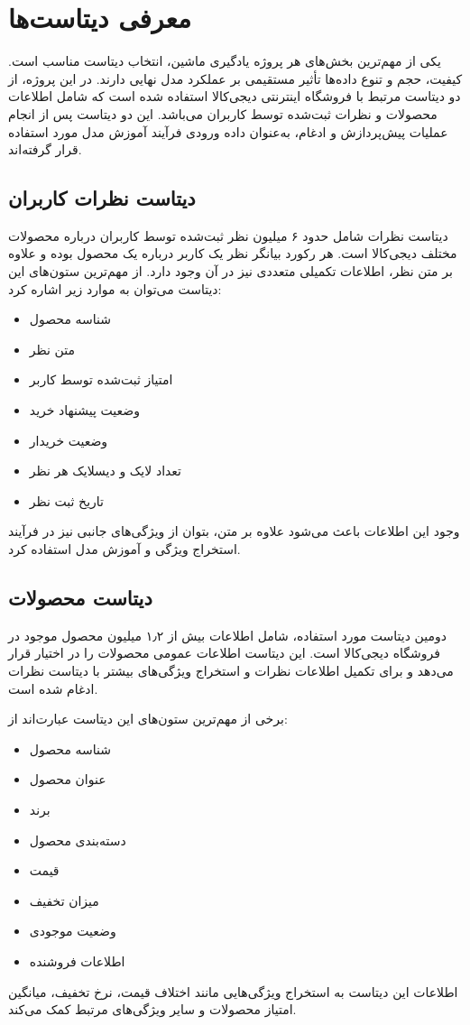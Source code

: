 \section{معرفی دیتاست‌ها}
یکی از مهم‌ترین بخش‌های هر پروژه یادگیری ماشین، انتخاب دیتاست مناسب است. کیفیت، حجم و تنوع داده‌ها تأثیر مستقیمی بر عملکرد مدل نهایی دارند. در این پروژه، از دو دیتاست مرتبط با فروشگاه اینترنتی دیجی‌کالا استفاده شده است که شامل اطلاعات محصولات و نظرات ثبت‌شده توسط کاربران می‌باشد. این دو دیتاست پس از انجام عملیات پیش‌پردازش و ادغام، به‌عنوان داده ورودی فرآیند آموزش مدل مورد استفاده قرار گرفته‌اند.
\subsection{دیتاست نظرات کاربران}
دیتاست نظرات شامل حدود ۶ میلیون نظر ثبت‌شده توسط کاربران درباره محصولات مختلف دیجی‌کالا است. هر رکورد بیانگر نظر یک کاربر درباره یک محصول بوده و علاوه بر متن نظر، اطلاعات تکمیلی متعددی نیز در آن وجود دارد. از مهم‌ترین ستون‌های این دیتاست می‌توان به موارد زیر اشاره کرد:
\begin{itemize}
	\item شناسه محصول 
	\item متن نظر 
	\item امتیاز ثبت‌شده توسط کاربر 
	\item وضعیت پیشنهاد خرید 
	\item وضعیت خریدار 
	\item تعداد لایک و دیسلایک هر نظر
	\item تاریخ ثبت نظر
\end{itemize}
وجود این اطلاعات باعث می‌شود علاوه بر متن، بتوان از ویژگی‌های جانبی نیز در فرآیند استخراج ویژگی و آموزش مدل استفاده کرد.
\subsection{دیتاست محصولات}
دومین دیتاست مورد استفاده، شامل اطلاعات بیش از ۱٫۲ میلیون محصول موجود در فروشگاه دیجی‌کالا است. این دیتاست اطلاعات عمومی محصولات را در اختیار قرار می‌دهد و برای تکمیل اطلاعات نظرات و استخراج ویژگی‌های بیشتر با دیتاست نظرات ادغام شده است.

برخی از مهم‌ترین ستون‌های این دیتاست عبارت‌اند از:
\begin{itemize}
	\item شناسه محصول
	\item عنوان محصول
	\item برند
	\item دسته‌بندی محصول
	\item قیمت
	\item میزان تخفیف
	\item وضعیت موجودی
	\item اطلاعات فروشنده
\end{itemize}
اطلاعات این دیتاست به استخراج ویژگی‌هایی مانند اختلاف قیمت، نرخ تخفیف، میانگین امتیاز محصولات و سایر ویژگی‌های مرتبط کمک می‌کند.

